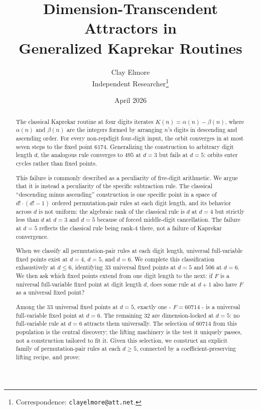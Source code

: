 \documentclass[11pt,letterpaper]{article}
\title{Dimension-Transcendent Attractors in\\
       Generalized Kaprekar Routines}
\author{Clay Elmore\\
        Independent Researcher\thanks{Correspondence: \texttt{clayelmore@att.net}.}}
\date{April 2026}
\theoremstyle{paperstyle}
\theoremstyle{paperstyledef}
\theoremstyle{paperstylerem}
\begin{document}
\maketitle

\begin{abstract}
The classical Kaprekar routine at four digits iterates \(K(n) = \alpha(n) - \beta(n)\), where \(\alpha(n)\) and \(\beta(n)\) are the integers formed by arranging \(n\)'s digits in descending and ascending order. For every non-repdigit four-digit input, the orbit converges in at most seven steps to the fixed point \(6174\). Generalizing the construction to arbitrary digit length \(d\), the analogous rule converges to \(495\) at \(d = 3\) but fails at \(d = 5\): orbits enter cycles rather than fixed points.

This failure is commonly described as a peculiarity of five-digit arithmetic. We argue that it is instead a peculiarity of the specific subtraction rule. The classical ``descending minus ascending'' construction is one specific point in a space of \(d! \cdot (d! - 1)\) ordered permutation-pair rules at each digit length, and its behavior across \(d\) is not uniform: the algebraic rank of the classical rule is \(d\) at \(d = 4\) but strictly less than \(d\) at \(d = 3\) and \(d = 5\) because of forced middle-digit cancellation. The failure at \(d = 5\) reflects the classical rule being rank-\(4\) there, not a failure of Kaprekar convergence.

When we classify all permutation-pair rules at each digit length, universal full-variable fixed points exist at \(d = 4\), \(d = 5\), and \(d = 6\). We complete this classification exhaustively at \(d \leq 6\), identifying \(33\) universal fixed points at \(d = 5\) and \(506\) at \(d = 6\). We then ask which fixed points extend from one digit length to the next: if \(F\) is a universal full-variable fixed point at digit length \(d\), does some rule at \(d + 1\) also have \(F\) as a universal fixed point?

Among the \(33\) universal fixed points at \(d = 5\), exactly one - \(F = 60714\) - is a universal full-variable fixed point at \(d = 6\). The remaining \(32\) are dimension-locked at \(d = 5\): no full-variable rule at \(d = 6\) attracts them universally. The selection of \(60714\) from this population is the central discovery; the lifting machinery is the test it uniquely passes, not a construction tailored to fit it. Given this selection, we construct an explicit family of permutation-pair rules at each \(d \geq 5\), connected by a coefficient-preserving lifting recipe, and prove:


\end{abstract}
\end{document}
